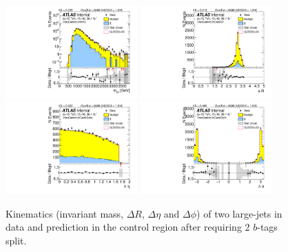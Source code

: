 \begin{figure}[htbp!]
\begin{center}
\includegraphics[width=0.45\textwidth,angle=-90]{figures/boosted/Control/b77_TwoTag_split_Control_mHH_l_1.pdf}
\includegraphics[width=0.45\textwidth,angle=-90]{figures/boosted/Control/b77_TwoTag_split_Control_hCandDr.pdf}\\
\includegraphics[width=0.45\textwidth,angle=-90]{figures/boosted/Control/b77_TwoTag_split_Control_hCandDeta.pdf}
\includegraphics[width=0.45\textwidth,angle=-90]{figures/boosted/Control/b77_TwoTag_split_Control_hCandDphi.pdf}
  \caption{Kinematics (invariant mass, $\Delta R$, $\Delta \eta$ and $\Delta \phi$) of two large-\R jets in data and prediction in the control region after requiring 2 $b$-tags split.  }
  \label{fig:boosted-2bs-control-ak10-system}
\end{center}
\end{figure}

